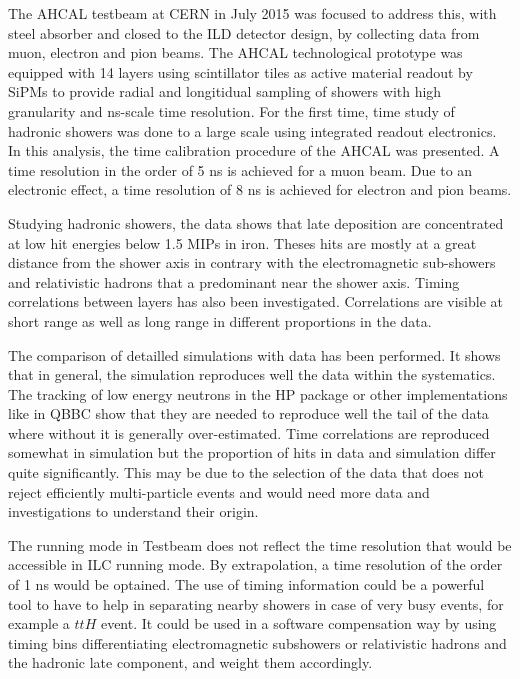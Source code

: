 The AHCAL testbeam at CERN in July 2015 was focused to address this, with steel absorber and closed to the ILD detector design, by collecting data from muon, electron and pion beams. The AHCAL technological prototype was equipped with 14 layers using scintillator tiles as active material readout by SiPMs to provide radial and longitidual sampling of showers with high granularity and ns-scale time resolution. For the first time, time study of hadronic showers was done to a large scale using integrated readout electronics.
In this analysis, the time calibration procedure of the AHCAL was presented. A time resolution in the order of 5 ns is achieved for a muon beam. Due to an electronic effect, a time resolution of 8 ns is achieved for electron and pion beams.

Studying hadronic showers, the data shows that late deposition are concentrated at low hit energies below 1.5 MIPs in iron. Theses hits are mostly at a great distance from the shower axis in contrary with the electromagnetic sub-showers and relativistic hadrons that a predominant near the shower axis. Timing correlations between layers has also been investigated. Correlations are visible at short range as well as long range in different proportions in the data.

The comparison of detailled simulations with data has been performed. It shows that in general, the simulation reproduces well the data within the systematics. The tracking of low energy neutrons in the HP package or other implementations like in QBBC show that they are needed to reproduce well the tail of the data where without it is generally over-estimated. Time correlations are reproduced somewhat in simulation but the proportion of hits in data and simulation differ quite significantly. This may be due to the selection of the data that does not reject efficiently multi-particle events and would need more data and investigations to understand their origin.

The running mode in Testbeam does not reflect the time resolution that would be accessible in ILC running mode. By extrapolation, a time resolution of the order of 1 ns would be optained. The use of timing information could be a powerful tool to have to help in separating nearby showers in case of very busy events, for example a $ttH$ event. It could be used in a software compensation way by using timing bins differentiating electromagnetic subshowers or relativistic hadrons and the hadronic late component, and weight them accordingly.

